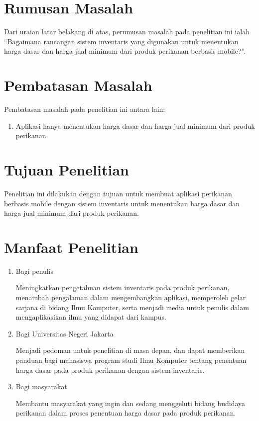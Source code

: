 \section{Rumusan Masalah}
Dari uraian latar belakang di atas, perumusan masalah pada penelitian ini ialah “Bagaimana rancangan sistem inventaris yang digunakan untuk menentukan harga dasar dan harga jual minimum dari produk perikanan berbasis mobile?”.

\section{Pembatasan Masalah}
Pembatasan masalah pada penelitian ini antara lain:
\begin{enumerate}
	\item Aplikasi hanya menentukan harga dasar dan harga jual minimum dari produk perikanan.
\end{enumerate}

\section{Tujuan Penelitian}
	Penelitian ini dilakukan dengan tujuan untuk membuat aplikasi perikanan berbasis mobile dengan sistem inventaris untuk menentukan harga dasar dan harga jual minimum dari produk perikanan.

\section{Manfaat Penelitian}
\begin{enumerate}
	\item Bagi penulis
		
	Meningkatkan pengetahuan sistem inventaris pada produk perikanan, menambah pengalaman dalam mengembangkan aplikasi, memperoleh gelar sarjana di bidang Ilmu Komputer, serta menjadi media untuk penulis dalam mengaplikasikan ilmu yang didapat dari kampus.
		
	\item Bagi Universitas Negeri Jakarta
	 	
	Menjadi pedoman untuk penelitian di masa depan, dan dapat memberikan panduan bagi mahasiswa program studi Ilmu Komputer tentang penentuan harga dasar pada produk perikanan dengan sistem inventaris.
	
	\item Bagi masyarakat
	 	
	Membantu masyarakat yang ingin dan sedang menggeluti bidang budidaya perikanan dalam proses penentuan harga dasar pada produk perikanan.
	 			
\end{enumerate}


\begin{comment}

\end{comment}
